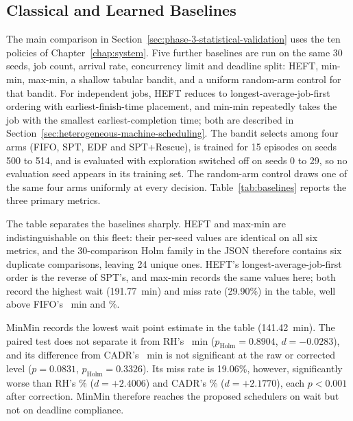 {\subsection{Classical and Learned Baselines}
\label{ssec:classical-and-learned-baselines}

The main comparison in Section~\ref{sec:phase-3-statistical-validation} uses the ten policies of Chapter~\ref{chap:system}. Five further baselines are run on the same 30 seeds, job count, arrival rate, concurrency limit and deadline split: HEFT, min-min, max-min, a shallow tabular bandit, and a uniform random-arm control for that bandit. For independent jobs, HEFT reduces to longest-average-job-first ordering with earliest-finish-time placement, and min-min repeatedly takes the job with the smallest earliest-completion time; both are described in Section~\ref{sec:heterogeneous-machine-scheduling}. The bandit selects among four arms (FIFO, SPT, EDF and SPT+Rescue), is trained for 15 episodes on seeds 500 to 514, and is evaluated with exploration switched off on seeds 0 to 29, so no evaluation seed appears in its training set. The random-arm control draws one of the same four arms uniformly at every decision. Table~\ref{tab:baselines} reports the three primary metrics.

\begin{table}[htbp]
\centering
\caption[Classical and learned baselines]{Classical and learned baselines on the Phase~3 hectic day ($n=30$ seeds, $\sim$950 jobs/day, $C_{\max}=5$, $\lambda=0.100$ j/s, 20\% tight 1h / 80\% loose 8h deadlines). HEFT and max-min produce identical values on every seed and every metric, so they are shown as one row. Mean tardiness is over completed jobs, with zero for on-time jobs. Bold marks the column minimum; the paired tests are in the text.}
\label{tab:baselines}

\end{table}

The table separates the baselines sharply. HEFT and max-min are indistinguishable on this fleet: their per-seed values are identical on all six metrics, and the 30-comparison Holm family in the JSON therefore contains six duplicate comparisons, leaving 24 unique ones. HEFT's longest-average-job-first order is the reverse of SPT's, and max-min records the same values here; both record the highest wait (191.77~min) and miss rate (29.90\%) in the table, well above FIFO's \FIFOwait~min and \FIFOmiss\%.

MinMin records the lowest wait point estimate in the table (141.42~min). The paired test does not separate it from RH's \RHWait~min ($p_{\text{Holm}}=0.8904$, $d=-0.0283$), and its difference from CADR's \CADRwait~min is not significant at the raw or corrected level ($p=0.0831$, $p_{\text{Holm}}=0.3326$). Its miss rate is 19.06\%, however, significantly worse than RH's \RHMiss\% ($d=+2.4006$) and CADR's \CADRmiss\% ($d=+2.1770$), each $p<0.001$ after correction. MinMin therefore reaches the proposed schedulers on wait but not on deadline compliance.

}

